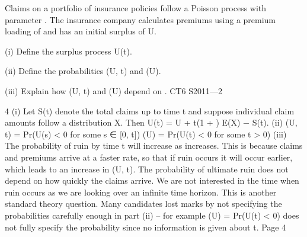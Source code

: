 \documentclass[a4paper,12pt]{article}
\begin{document}
Claims on a portfolio of insurance policies follow a Poisson process with parameter \lambda .
The insurance company calculates premiums using a premium loading of \theta  and has an
initial surplus of U.
\item (i) Define the surplus process U(t). 
\item (ii) Define the probabilities \psi (U, t) and \psi (U). 
\item (iii) Explain how \psi (U, t) and \psi (U) depend on \lambda .
CT6 S2011—2





4
(i)
Let S(t) denote the total claims up to time t and suppose individual claim
amounts follow a distribution X.
Then U(t) = U + \lambda t(1 + \theta ) E(X) − S(t).
(ii)
\psi (U, t) = Pr(U(s) < 0 for some s ∈ [0, t])
\psi (U) = Pr(U(t) < 0 for some t > 0)
(iii)
The probability of ruin by time t will increase as \lambda  increases. This is because
claims and premiums arrive at a faster rate, so that if ruin occurs it will occur
earlier, which leads to an increase in \psi (U, t).
The probability of ultimate ruin does not depend on how quickly the claims
arrive. We are not interested in the time when ruin occurs as we are looking
over an infinite time horizon.
This is another standard theory question. Many candidates lost marks by not specifying the
probabilities carefully enough in part (ii) – for example \psi  (U) = Pr(U(t) < 0) does not fully
specify the probability since no information is given about t.
Page 4%
\end{document}
